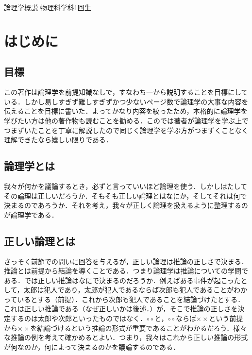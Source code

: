 \documentclass[10pt,b5paper,papersize,dvipdfmx]{jsbook}
\begin{document}


\kaishititle%
  {論理学概説}%
  {物理科学科1回生}%
  {}%

\section{はじめに}
\subsection{目標}
この著作は論理学を前提知識なしで，すなわち一から説明することを目標にしている．しかし易しすぎず難しすぎずかつ少ないページ数で論理学の大事な内容を伝えることを目標に書いた．よってかなり内容を絞ったため，本格的に論理学を学びたい方は他の著作物も読むことを勧める．このでは著者が論理学を学ぶ上でつまずいたことを丁寧に解説したので同じく論理学を学ぶ方がつまずくことなく理解できたなら嬉しい限りである．

\subsection{論理学とは}
我々が何かを議論するとき，必ずと言っていいほど論理を使う．しかしはたしてその論理は正しいだろうか．そもそも正しい論理とはなにか，そしてそれは何で決まるのであろうか．それを考え，我々が正しく論理を扱えるように整理するのが論理学である．

\subsection{正しい論理とは}
さっそく前節での問いに回答を与えるが，正しい論理は推論の正しさで決まる．推論とは前提から結論を導くことである．つまり論理学は推論についての学問である．では正しい推論はなにで決まるのだろうか．例えばある事件が起こったとして，太郎は犯人であり，太郎が犯人であるならば次郎も犯人であることがわかっているとする（前提）．これから次郎も犯人であることを結論づけたとする．これは正しい推論である（なぜ正しいかは後述．）が，そこで推論の正しさを決定するのは太郎や次郎といったものではなく．$\circ \circ$と，$\circ \circ$ならば$\times \times$という前提から$\times \times$を結論づけるという推論の形式が重要であることがわかるだろう．様々な推論の例を考えて確かめるとよい．つまり，我々はこれから正しい推論の形式が何なのか，何によって決まるのかを議論するのである．
\end{document}
